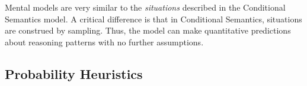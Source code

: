 \documentclass[10pt,letterpaper]{article}
\begin{document}
Mental models are very similar to the \emph{situations} described in the Conditional Semantics model. A critical difference is that in Conditional Semantics, situations are construed by sampling. Thus, the model can make quantitative predictions about reasoning patterns with no further assumptions.


%

\subsection{Probability Heuristics}
\end{document}
